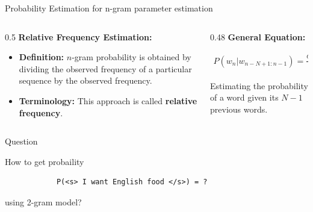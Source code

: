 \documentclass[aspectratio=169,xcolor=dvipsnames,svgnames,x11names,fleqn]{beamer}
\begin{document}
\begin{frame}[fragile]{Probability Estimation for n-gram parameter estimation}
\begin{columns}[T]
    \begin{column}{0.5\textwidth}
        \textcolor{blockBlue}{\textbf{Relative Frequency Estimation:}}
        
        \vspace{10pt}
        \begin{itemize}
            \item \textbf{Definition:} $n$-gram probability is obtained by dividing the observed frequency of a particular sequence by the observed frequency. 
            
            \vspace{10pt}
            \item \textbf{Terminology:} This approach is called \textcolor{logicGreen!70!black}{\textbf{relative frequency}}.
        \end{itemize}
    \end{column}

    \begin{column}{0.48\textwidth}
        \centering
        \textbf{General Equation:}
        
        \vspace{10pt}
        \begin{tcolorbox}[colback=vggDeepBlue!5, colframe=vggDeepBlue, arc=1mm, boxrule=0.8pt]
            \small
            \begin{align*}
            P(w_n | w_{n-N + 1: n-1}) = \frac{C(w_{n-N+1:n-1} w_n)}{C(w_{n-N+1:n-1})}
            \end{align*}
        \end{tcolorbox}
        
        \vspace{5pt}
        \scriptsize \textcolor{citeGray}{Estimating the probability of a word given its $N-1$ previous words.}
    \end{column}
\end{columns}
\end{frame}



\begin{frame}[fragile]{Question}

How to get probaility 

 \begin{verbatim}
            P(<s> I want English food </s>) = ?
		 \end{verbatim}
		 
using 2-gram model?
		 

\end{frame}
\end{document}
